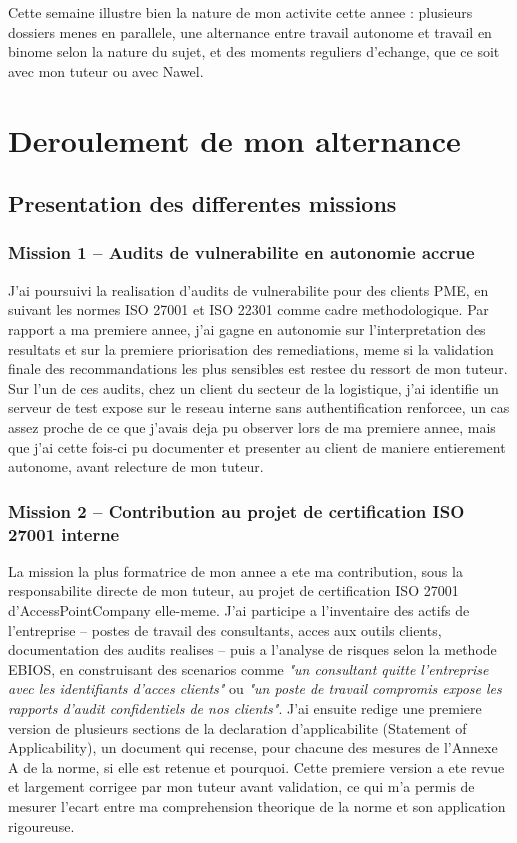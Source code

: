 \documentclass[11pt,a4paper]{article}
\begin{document}
Cette semaine illustre bien la nature de mon activite cette annee : plusieurs dossiers menes en parallele, une alternance entre travail autonome et travail en binome selon la nature du sujet, et des moments reguliers d'echange, que ce soit avec mon tuteur ou avec Nawel.

\newpage
\section{Deroulement de mon alternance}

\subsection{Presentation des differentes missions}

\subsubsection*{Mission 1 -- Audits de vulnerabilite en autonomie accrue}

J'ai poursuivi la realisation d'audits de vulnerabilite pour des clients PME, en suivant les normes ISO 27001 et ISO 22301 comme cadre methodologique. Par rapport a ma premiere annee, j'ai gagne en autonomie sur l'interpretation des resultats et sur la premiere priorisation des remediations, meme si la validation finale des recommandations les plus sensibles est restee du ressort de mon tuteur. Sur l'un de ces audits, chez un client du secteur de la logistique, j'ai identifie un serveur de test expose sur le reseau interne sans authentification renforcee, un cas assez proche de ce que j'avais deja pu observer lors de ma premiere annee, mais que j'ai cette fois-ci pu documenter et presenter au client de maniere entierement autonome, avant relecture de mon tuteur.

\subsubsection*{Mission 2 -- Contribution au projet de certification ISO 27001 interne}

La mission la plus formatrice de mon annee a ete ma contribution, sous la responsabilite directe de mon tuteur, au projet de certification ISO 27001 d'AccessPointCompany elle-meme. J'ai participe a l'inventaire des actifs de l'entreprise -- postes de travail des consultants, acces aux outils clients, documentation des audits realises -- puis a l'analyse de risques selon la methode EBIOS, en construisant des scenarios comme \emph{"un consultant quitte l'entreprise avec les identifiants d'acces clients"} ou \emph{"un poste de travail compromis expose les rapports d'audit confidentiels de nos clients"}. J'ai ensuite redige une premiere version de plusieurs sections de la declaration d'applicabilite (Statement of Applicability), un document qui recense, pour chacune des mesures de l'Annexe A de la norme, si elle est retenue et pourquoi. Cette premiere version a ete revue et largement corrigee par mon tuteur avant validation, ce qui m'a permis de mesurer l'ecart entre ma comprehension theorique de la norme et son application rigoureuse.
\end{document}
